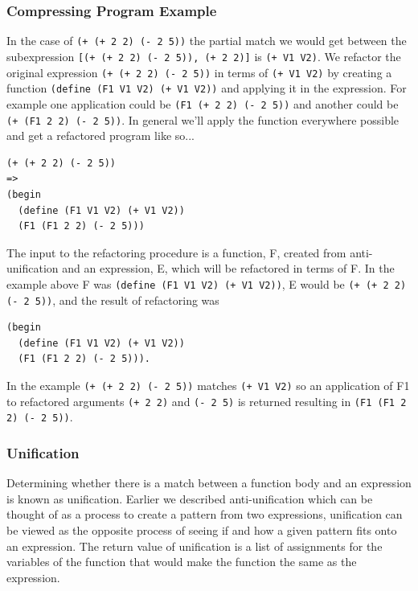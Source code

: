 \documentclass[a4paper,10pt]{article}
\begin{document}
\subsubsection{Compressing Program Example}
In the case of \texttt{(+ (+ 2 2) (- 2 5))} the partial match we would get between the subexpression \texttt{[(+ (+ 2 2) (- 2 5)), (+ 2 2)]} is \texttt{(+ V1 V2)}.  We refactor the original expression \texttt{(+ (+ 2 2) (- 2 5))} in terms of \texttt{(+ V1 V2)} by creating a function \texttt{(define (F1 V1 V2) (+ V1 V2))} and applying it in the expression.  For example one application could be \texttt{(F1 (+ 2 2) (- 2 5))} and another could be \texttt{(+ (F1 2 2) (- 2 5))}.  In general we'll apply the function everywhere possible and get a refactored program like so...
\begin{verbatim}
(+ (+ 2 2) (- 2 5))
=>
(begin
  (define (F1 V1 V2) (+ V1 V2))
  (F1 (F1 2 2) (- 2 5)))
\end{verbatim}
The input to the refactoring procedure is a function, F, created from anti-unification and an expression, E, which will be refactored in terms of F.  In the example above F was \texttt{(define (F1 V1 V2) (+ V1 V2))}, E would be \texttt{(+ (+ 2 2) (- 2 5))}, and the result of refactoring was 
\begin{verbatim}
(begin
  (define (F1 V1 V2) (+ V1 V2))
  (F1 (F1 2 2) (- 2 5))).
\end{verbatim}

In the example \texttt{(+ (+ 2 2) (- 2 5))} matches \texttt{(+ V1 V2)} so an application of F1 to refactored arguments \texttt{(+ 2 2)} and \texttt{(- 2 5)} is returned resulting in \texttt{(F1 (F1 2 2) (- 2 5))}.  


\subsubsection{Unification}
Determining whether there is a match between a function body and an expression is known as unification.  Earlier we described anti-unification which can be thought of as a process to create a pattern from two expressions, unification can be viewed as the opposite process of seeing if and how a given pattern fits onto an expression.  The return value of unification is a list of assignments for the variables of the function that would make the function the same as the expression.
\end{document}
